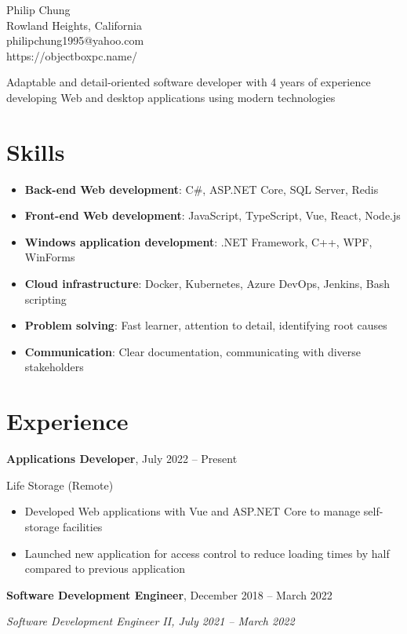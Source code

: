 \documentclass[11pt]{article}
\newcommand{\titleheader}[2]{\textbf{#1}, #2}
\newcommand{\secondaryheader}[1]{\hspace{2.25em} \textit{#1}}
\newcommand{\locheader}[2]{#1 (#2)}
\begin{document}
	\begin{center}
		{\LARGE Philip Chung} \\
		Rowland Heights, California \\
		philipchung1995@yahoo.com \\
		https://objectboxpc.name/
	\end{center}

	Adaptable and detail-oriented software developer with 4 years of experience developing Web and desktop applications using modern technologies

	\section*{Skills}

	\newcommand{\skillitem}[2]{\item \textbf{#1}: #2}

	\begin{itemize}
		\skillitem{Back-end Web development}{C\#, ASP.NET Core, SQL Server, Redis}
		\skillitem{Front-end Web development}{JavaScript, TypeScript, Vue, React, Node.js}
		\skillitem{Windows application development}{.NET Framework, C++, WPF, WinForms}
		\skillitem{Cloud infrastructure}{Docker, Kubernetes, Azure DevOps, Jenkins, Bash scripting}
		\skillitem{Problem solving}{Fast learner, attention to detail, identifying root causes}
		\skillitem{Communication}{Clear documentation, communicating with diverse stakeholders}
	\end{itemize}

	\section*{Experience}

	\titleheader{Applications Developer}{July 2022 -- Present}

	\locheader{Life Storage}{Remote}

	\begin{itemize}
		\item Developed Web applications with Vue and ASP.NET Core to manage self-storage facilities
		\item Launched new application for access control to reduce loading times by half compared to previous application
	\end{itemize}

	\titleheader{Software Development Engineer}{December 2018 -- March 2022}

	\secondaryheader{Software Development Engineer II, July 2021 -- March 2022}
\end{document}
